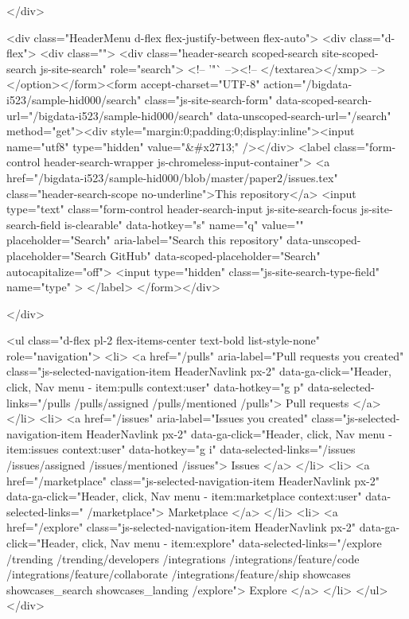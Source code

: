     </div>

    <div class="HeaderMenu d-flex flex-justify-between flex-auto">
      <div class="d-flex">
            <div class="">
              <div class="header-search scoped-search site-scoped-search js-site-search" role="search">
  <!-- '"` --><!-- </textarea></xmp> --></option></form><form accept-charset="UTF-8" action="/bigdata-i523/sample-hid000/search" class="js-site-search-form" data-scoped-search-url="/bigdata-i523/sample-hid000/search" data-unscoped-search-url="/search" method="get"><div style="margin:0;padding:0;display:inline"><input name="utf8" type="hidden" value="&#x2713;" /></div>
    <label class="form-control header-search-wrapper js-chromeless-input-container">
        <a href="/bigdata-i523/sample-hid000/blob/master/paper2/issues.tex" class="header-search-scope no-underline">This repository</a>
      <input type="text"
        class="form-control header-search-input js-site-search-focus js-site-search-field is-clearable"
        data-hotkey="s"
        name="q"
        value=""
        placeholder="Search"
        aria-label="Search this repository"
        data-unscoped-placeholder="Search GitHub"
        data-scoped-placeholder="Search"
        autocapitalize="off">
        <input type="hidden" class="js-site-search-type-field" name="type" >
    </label>
</form></div>

            </div>

          <ul class="d-flex pl-2 flex-items-center text-bold list-style-none" role="navigation">
            <li>
              <a href="/pulls" aria-label="Pull requests you created" class="js-selected-navigation-item HeaderNavlink px-2" data-ga-click="Header, click, Nav menu - item:pulls context:user" data-hotkey="g p" data-selected-links="/pulls /pulls/assigned /pulls/mentioned /pulls">
                Pull requests
</a>            </li>
            <li>
              <a href="/issues" aria-label="Issues you created" class="js-selected-navigation-item HeaderNavlink px-2" data-ga-click="Header, click, Nav menu - item:issues context:user" data-hotkey="g i" data-selected-links="/issues /issues/assigned /issues/mentioned /issues">
                Issues
</a>            </li>
                <li>
                  <a href="/marketplace" class="js-selected-navigation-item HeaderNavlink px-2" data-ga-click="Header, click, Nav menu - item:marketplace context:user" data-selected-links=" /marketplace">
                    Marketplace
</a>                </li>
            <li>
              <a href="/explore" class="js-selected-navigation-item HeaderNavlink px-2" data-ga-click="Header, click, Nav menu - item:explore" data-selected-links="/explore /trending /trending/developers /integrations /integrations/feature/code /integrations/feature/collaborate /integrations/feature/ship showcases showcases_search showcases_landing /explore">
                Explore
</a>            </li>
          </ul>
      </div>

